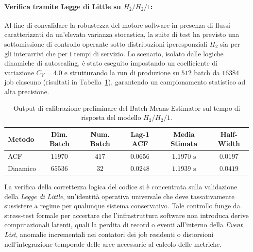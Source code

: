 ﻿\documentclass[a4paper,12pt]{article}
\begin{document}
\paragraph{Verifica tramite Legge di Little su $H_2/H_2/1$:}
Al fine di convalidare la robustezza del motore software in presenza di flussi caratterizzati da un'elevata varianza stocastica, la suite di test ha previsto una sottomissione di controllo operante sotto distribuzioni iperesponziali $H_2$ sia per gli interarrivi che per i tempi di servizio. Lo scenario, isolato dalle logiche dinamiche di autoscaling, è stato eseguito impostando un coefficiente di variazione $C_V = 4.0$ e strutturando la run di produzione su $512$ batch da $16384$ job ciascuno (risultati in Tabella~\ref{tab:batch_means_hyperexp_calibration}), garantendo un campionamento statistico ad alta precisione.

\begin{table}[htbp]
    \centering
    \small
    \renewcommand{\arraystretch}{1.3}
    \begin{tabular}{lccccc}
        \hline
        \textbf{Metodo} & \textbf{Dim. Batch} & \textbf{Num. Batch} & \textbf{Lag-1 ACF} & \textbf{Media Stimata} & \textbf{Half-Width}     \\ \hline
        ACF             & $11970$                   & $417$                     & $0.0656$           & $1.1970\text{ s}$      & $0.0197$    \\
        Dinamico        & $65536$                   & $32$                      & $0.0248$           & $1.1939\text{ s}$      & $0.0419$    \\ \hline
    \end{tabular}
    \caption{Output di calibrazione preliminare del Batch Means Estimator sul tempo di risposta del modello $H_2/H_2/1$.}
    \label{tab:batch_means_hyperexp_calibration}
\end{table}

La verifica della correttezza logica del codice si è concentrata sulla validazione della \textit{Legge di Little}, un'identità operativa universale che deve tassativamente sussistere a regime per qualunque sistema conservativo. Tale controllo funge da stress-test formale per accertare che l'infrastruttura software non introduca derive computazionali latenti, quali la perdita di record o eventi all'interno della \textit{Event List}, anomalie incrementali nei contatori dei job residenti o distorsioni nell'integrazione temporale delle aree necessarie al calcolo delle metriche.
\end{document}
